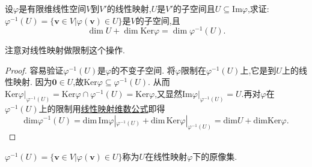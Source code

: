\documentclass[../../main.tex]{subfiles}
\begin{document}
\begin{example}
设\(\varphi\)是有限维线性空间\(V\)到\(V'\)的线性映射,\(U\)是\(V'\)的子空间且\(U\subseteq\text{Im}\varphi\),求证:\(\varphi^{-1}(U)=\{\boldsymbol{v}\in V|\varphi(\boldsymbol{v})\in U\}\)是\(V\)的子空间,且
\[
\dim U+\dim\text{Ker}\varphi=\dim\varphi^{-1}(U).
\]
\end{example}
\begin{note}
注意对线性映射做限制这个操作.
\end{note}
\begin{proof}
容易验证\(\varphi^{-1}(U)\)是\(\varphi\)的不变子空间. 将\(\varphi\)限制在\(\varphi^{-1}(U)\)上,它是到\(U\)上的线性映射. 因为\(\boldsymbol{0}\in U\),故\(\text{Ker}\varphi\subseteq\varphi^{-1}(U)\). 从而$\text{Ker}\varphi |_{\varphi ^{-1}\left( U \right)}=\mathrm{Ker}\varphi \cap \varphi ^{-1}\left( U \right) =\mathrm{Ker}\varphi $,又显然$\text{Im}\varphi |_{\varphi ^{-1}\left( U \right)}=U$.再对\(\varphi\)在\(\varphi^{-1}(U)\)上的限制用\hyperref[theorem:值域和核空间维数之和等于原像空间维数]{线性映射维数公式}即得
\[
\mathrm{dim}\varphi ^{-1}\left( U \right) =\mathrm{dim}\,\mathrm{Im}\varphi |_{\varphi ^{-1}\left( U \right)}+\mathrm{dim}\,\mathrm{Ker}\varphi |_{\varphi ^{-1}\left( U \right)}=\mathrm{dim}U+\mathrm{dimKer}\varphi .
\]
\end{proof}
\begin{remark}
\(\varphi^{-1}(U)=\{\boldsymbol{v}\in V|\varphi(\boldsymbol{v})\in U\}\)称为$U$在线性映射$\varphi$下的原像集.
\end{remark}
\end{document}
